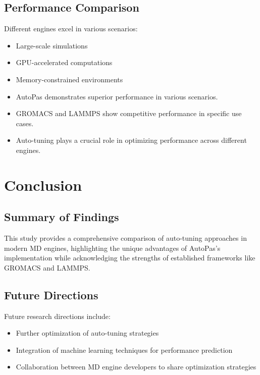 \documentclass[conference]{IEEEtran}
\begin{document}
\subsection{Performance Comparison}


Different engines excel in various scenarios:
\begin{itemize}
    \item Large-scale simulations
    \item GPU-accelerated computations
    \item Memory-constrained environments
\end{itemize}



\begin{itemize}
    \item AutoPas demonstrates superior performance in various scenarios.
    \item GROMACS and LAMMPS show competitive performance in specific use cases.
    \item Auto-tuning plays a crucial role in optimizing performance across different engines.
\end{itemize}



\section{Conclusion}

\subsection{Summary of Findings}

This study provides a comprehensive comparison of auto-tuning approaches in modern MD engines, highlighting the unique advantages of AutoPas's implementation while acknowledging the strengths of established frameworks like GROMACS and LAMMPS.

\subsection{Future Directions}

Future research directions include:
\begin{itemize}
    \item Further optimization of auto-tuning strategies
    \item Integration of machine learning techniques for performance prediction
    \item Collaboration between MD engine developers to share optimization strategies
\end{itemize}

\cite{Gratl2019AutoPasAF}







\newpage
\newpage
\tableofcontents
\end{document}
